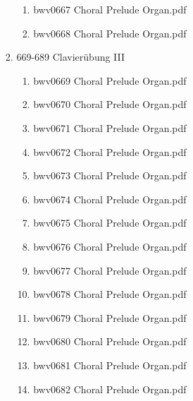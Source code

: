 \documentclass[11pt]{article}
\begin{document}
\begin{enumerate}
\begin{enumerate}
\begin{enumerate}
\begin{enumerate}
\item bwv0667   Choral Prelude Organ.pdf
\label{sec-1-1-1-1-44-6-4-1-14-19}

\item bwv0668   Choral Prelude Organ.pdf
\label{sec-1-1-1-1-44-6-4-1-14-20}
\end{enumerate}

\item 669-689 Clavierübung III
\label{sec-1-1-1-1-44-6-4-1-15}
\begin{enumerate}
\item bwv0669   Choral Prelude Organ.pdf
\label{sec-1-1-1-1-44-6-4-1-15-1}

\item bwv0670   Choral Prelude Organ.pdf
\label{sec-1-1-1-1-44-6-4-1-15-2}

\item bwv0671   Choral Prelude Organ.pdf
\label{sec-1-1-1-1-44-6-4-1-15-3}

\item bwv0672   Choral Prelude Organ.pdf
\label{sec-1-1-1-1-44-6-4-1-15-4}

\item bwv0673   Choral Prelude Organ.pdf
\label{sec-1-1-1-1-44-6-4-1-15-5}

\item bwv0674   Choral Prelude Organ.pdf
\label{sec-1-1-1-1-44-6-4-1-15-6}

\item bwv0675   Choral Prelude Organ.pdf
\label{sec-1-1-1-1-44-6-4-1-15-7}

\item bwv0676   Choral Prelude Organ.pdf
\label{sec-1-1-1-1-44-6-4-1-15-8}

\item bwv0677   Choral Prelude Organ.pdf
\label{sec-1-1-1-1-44-6-4-1-15-9}

\item bwv0678   Choral Prelude Organ.pdf
\label{sec-1-1-1-1-44-6-4-1-15-10}

\item bwv0679   Choral Prelude Organ.pdf
\label{sec-1-1-1-1-44-6-4-1-15-11}

\item bwv0680   Choral Prelude Organ.pdf
\label{sec-1-1-1-1-44-6-4-1-15-12}

\item bwv0681   Choral Prelude Organ.pdf
\label{sec-1-1-1-1-44-6-4-1-15-13}

\item bwv0682   Choral Prelude Organ.pdf
\label{sec-1-1-1-1-44-6-4-1-15-14}


\end{enumerate}
\end{enumerate}
\end{enumerate}
\end{enumerate}
\end{document}
